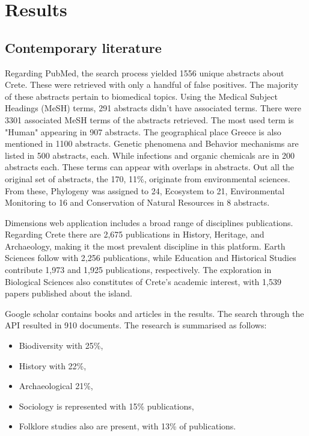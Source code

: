 \section{Results}\label{crete_idea_results}

\subsection{Contemporary literature}

Regarding PubMed, the search process yielded 1556 unique abstracts about Crete.
These were retrieved with only a handful of false positives.
The majority of these abstracts pertain to biomedical topics.
Using the Medical Subject Headings (MeSH) terms, 291 abstracts didn't have associated terms. 
There were 3301 associated MeSH terms of the abstracts retrieved. 
The most used term is "Human" appearing in 907 abstracts. The geographical 
place Greece is also mentioned in 1100 abstracts. Genetic phenomena
and Behavior mechanisms are listed in 500 abstracts, each. 
While infections and organic chemicals are in 200 abstracts each. These terms 
can appear with overlaps in abstracts.
Out all the original set of abstracts, the 170, 11\%, originate from environmental sciences.
From these, Phylogeny was assigned to 24, Ecosystem to 21, Environmental Monitoring to 16
and Conservation of Natural Resources in 8 abstracts.

Dimensions web application includes a broad range of disciplines publications.
Regarding Crete there are 2,675 publications in History, Heritage, and Archaeology,
making it the most prevalent discipline in this platform.
Earth Sciences follow with 2,256 publications, while Education and Historical
Studies contribute 1,973 and 1,925 publications, respectively.
The exploration in Biological Sciences also constitutes of
Crete's academic interest, with 1,539 papers published about the island.

Google scholar contains books and articles in the results. The search through
the API resulted in 910 documents. 
The research is summarised as follows:

\begin{itemize}
    \item Biodiversity with 25\%,
    \item History with 22\%,
    \item Archaeological 21\%,
    \item Sociology is represented with 15\% publications,
    \item Folklore studies also are present, with 13\% of publications.
\end{itemize}

